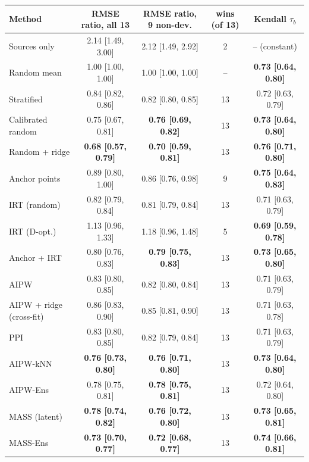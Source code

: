 \begin{tabular}{lcccc}
\toprule
Method & RMSE ratio, all 13 & RMSE ratio, 9 non-dev. & wins (of 13) & Kendall $\tau_b$ \\
\midrule
Sources only & 2.14 [1.49, 3.00] & 2.12 [1.49, 2.92] & 2 & -- (constant) \\
Random mean & 1.00 [1.00, 1.00] & 1.00 [1.00, 1.00] & -- & \textbf{0.73 [0.64, 0.80]} \\
Stratified & 0.84 [0.82, 0.86] & 0.82 [0.80, 0.85] & 13 & 0.72 [0.63, 0.79] \\
Calibrated random & 0.75 [0.67, 0.81] & \textbf{0.76 [0.69, 0.82]} & 13 & \textbf{0.73 [0.64, 0.80]} \\
Random + ridge & \textbf{0.68 [0.57, 0.79]} & \textbf{0.70 [0.59, 0.81]} & 13 & \textbf{0.76 [0.71, 0.80]} \\
Anchor points & 0.89 [0.80, 1.00] & 0.86 [0.76, 0.98] & 9 & \textbf{0.75 [0.64, 0.83]} \\
IRT (random) & 0.82 [0.79, 0.84] & 0.81 [0.79, 0.84] & 13 & 0.71 [0.63, 0.79] \\
IRT (D-opt.) & 1.13 [0.96, 1.33] & 1.18 [0.96, 1.48] & 5 & \textbf{0.69 [0.59, 0.78]} \\
Anchor + IRT & 0.80 [0.76, 0.83] & \textbf{0.79 [0.75, 0.83]} & 13 & \textbf{0.73 [0.65, 0.80]} \\
AIPW & 0.83 [0.80, 0.85] & 0.82 [0.80, 0.84] & 13 & 0.71 [0.63, 0.79] \\
AIPW + ridge (cross-fit) & 0.86 [0.83, 0.90] & 0.85 [0.81, 0.90] & 13 & 0.71 [0.63, 0.78] \\
PPI & 0.83 [0.80, 0.85] & 0.82 [0.79, 0.84] & 13 & 0.71 [0.63, 0.79] \\
AIPW-kNN & \textbf{0.76 [0.73, 0.80]} & \textbf{0.76 [0.71, 0.80]} & 13 & \textbf{0.73 [0.64, 0.80]} \\
AIPW-Ens & 0.78 [0.75, 0.81] & \textbf{0.78 [0.75, 0.81]} & 13 & 0.72 [0.64, 0.80] \\
MASS (latent) & \textbf{0.78 [0.74, 0.82]} & \textbf{0.76 [0.72, 0.80]} & 13 & \textbf{0.73 [0.65, 0.81]} \\
MASS-Ens & \textbf{0.73 [0.70, 0.77]} & \textbf{0.72 [0.68, 0.77]} & 13 & \textbf{0.74 [0.66, 0.81]} \\
\bottomrule
\end{tabular}
